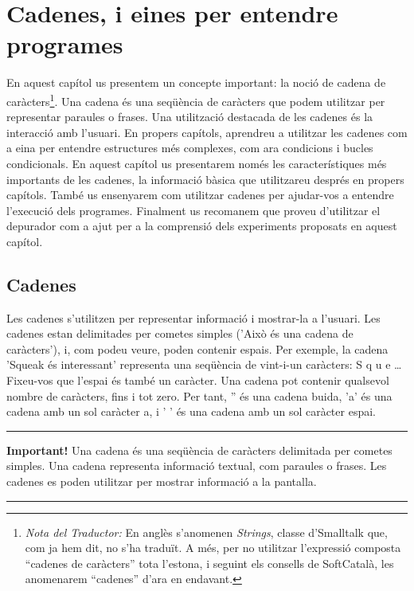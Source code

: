 \chapter{Cadenes, i eines per entendre programes} 
\label{cap17}

En aquest capítol us presentem un concepte important: la noció de cadena de caràcters\footnote{\emph{Nota del Traductor:} En anglès s'anomenen \emph{Strings}, classe d'Smalltalk que, com ja hem dit, no s'ha traduït. A més, per no utilitzar l'expressió composta ``cadenes de caràcters'' tota l'estona, i seguint els consells de SoftCatalà, les anomenarem ``cadenes'' d'ara en endavant.}. Una cadena és una seqüència de caràcters que podem utilitzar per representar paraules o frases. Una utilització destacada de les cadenes és la interacció amb l'usuari. En propers capítols, aprendreu a utilitzar les cadenes com a eina per entendre estructures més complexes, com ara condicions i bucles condicionals. En aquest capítol us presentarem només les característiques més importants de les cadenes, la informació bàsica que utilitzareu després en propers capítols. També us ensenyarem com utilitzar cadenes per ajudar-vos a entendre l'execució dels programes. Finalment us recomanem que proveu d'utilitzar el depurador com a ajut per a la comprensió dels experiments proposats en aquest capítol.

\section{Cadenes}
Les cadenes s'utilitzen per representar informació i mostrar-la a l'usuari. Les cadenes estan delimitades per cometes simples (\textsf{'Això és una cadena de caràcters'}), i, com podeu veure, poden contenir espais. Per exemple, la cadena \textsf{'Squeak és interessant'} representa una seqüència de vint-i-un caràcters: S q u e \dots Fixeu-vos que l'espai és també un caràcter. Una cadena pot contenir qualsevol nombre de caràcters, fins i tot zero. Per tant, \textsf{''} és una cadena buida, \textsf{'a'} és una cadena amb un sol caràcter a, i \textsf{'  '} és una cadena amb un sol caràcter espai.
 
\noindent
\rule{\textwidth}{2pt}
\noindent
\textbf{Important!} Una cadena és una seqüència de caràcters delimitada per cometes simples. Una cadena representa informació textual, com paraules o frases. Les cadenes es poden utilitzar per mostrar informació a la pantalla.\\
\noindent
\rule{\textwidth}{2pt}

